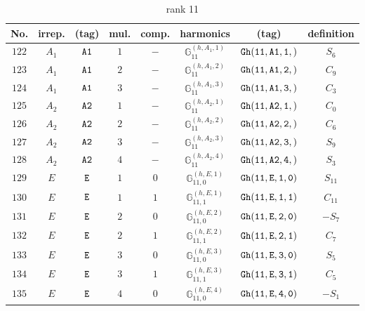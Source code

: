 \documentclass[fleqn,8pt]{jsarticle}
\begin{document}
\begin{table}[ht!]
\begin{center}
\caption{rank 11}
\renewcommand{\arraystretch}{1.3}
\begin{tabular}{cccccccc} \hline \hline
No. & irrep. & (tag) & mul. & comp. & harmonics & (tag) & definition \\ \hline
$ 122 $ & $ A_{1} $ & $ {\tt A1} $ & $ 1 $ & $ - $ & $ \mathbb{G}_{11}^{(h,A_{1},1)} $ & $ {\tt Gh(11,A1,1,)} $ & $ S_{6} $ \\
$ 123 $ & $ A_{1} $ & $ {\tt A1} $ & $ 2 $ & $ - $ & $ \mathbb{G}_{11}^{(h,A_{1},2)} $ & $ {\tt Gh(11,A1,2,)} $ & $ C_{9} $ \\
$ 124 $ & $ A_{1} $ & $ {\tt A1} $ & $ 3 $ & $ - $ & $ \mathbb{G}_{11}^{(h,A_{1},3)} $ & $ {\tt Gh(11,A1,3,)} $ & $ C_{3} $ \\
$ 125 $ & $ A_{2} $ & $ {\tt A2} $ & $ 1 $ & $ - $ & $ \mathbb{G}_{11}^{(h,A_{2},1)} $ & $ {\tt Gh(11,A2,1,)} $ & $ C_{0} $ \\
$ 126 $ & $ A_{2} $ & $ {\tt A2} $ & $ 2 $ & $ - $ & $ \mathbb{G}_{11}^{(h,A_{2},2)} $ & $ {\tt Gh(11,A2,2,)} $ & $ C_{6} $ \\
$ 127 $ & $ A_{2} $ & $ {\tt A2} $ & $ 3 $ & $ - $ & $ \mathbb{G}_{11}^{(h,A_{2},3)} $ & $ {\tt Gh(11,A2,3,)} $ & $ S_{9} $ \\
$ 128 $ & $ A_{2} $ & $ {\tt A2} $ & $ 4 $ & $ - $ & $ \mathbb{G}_{11}^{(h,A_{2},4)} $ & $ {\tt Gh(11,A2,4,)} $ & $ S_{3} $ \\
$ 129 $ & $ E $ & $ {\tt E} $ & $ 1 $ & $ 0 $ & $ \mathbb{G}_{11,0}^{(h,E,1)} $ & $ {\tt Gh(11,E,1,0)} $ & $ S_{11} $ \\
$ 130 $ & $ E $ & $ {\tt E} $ & $ 1 $ & $ 1 $ & $ \mathbb{G}_{11,1}^{(h,E,1)} $ & $ {\tt Gh(11,E,1,1)} $ & $ C_{11} $ \\
$ 131 $ & $ E $ & $ {\tt E} $ & $ 2 $ & $ 0 $ & $ \mathbb{G}_{11,0}^{(h,E,2)} $ & $ {\tt Gh(11,E,2,0)} $ & $ - S_{7} $ \\
$ 132 $ & $ E $ & $ {\tt E} $ & $ 2 $ & $ 1 $ & $ \mathbb{G}_{11,1}^{(h,E,2)} $ & $ {\tt Gh(11,E,2,1)} $ & $ C_{7} $ \\
$ 133 $ & $ E $ & $ {\tt E} $ & $ 3 $ & $ 0 $ & $ \mathbb{G}_{11,0}^{(h,E,3)} $ & $ {\tt Gh(11,E,3,0)} $ & $ S_{5} $ \\
$ 134 $ & $ E $ & $ {\tt E} $ & $ 3 $ & $ 1 $ & $ \mathbb{G}_{11,1}^{(h,E,3)} $ & $ {\tt Gh(11,E,3,1)} $ & $ C_{5} $ \\
$ 135 $ & $ E $ & $ {\tt E} $ & $ 4 $ & $ 0 $ & $ \mathbb{G}_{11,0}^{(h,E,4)} $ & $ {\tt Gh(11,E,4,0)} $ & $ - S_{1} $ \\

\end{tabular}
\end{center}
\end{table}
\end{document}
